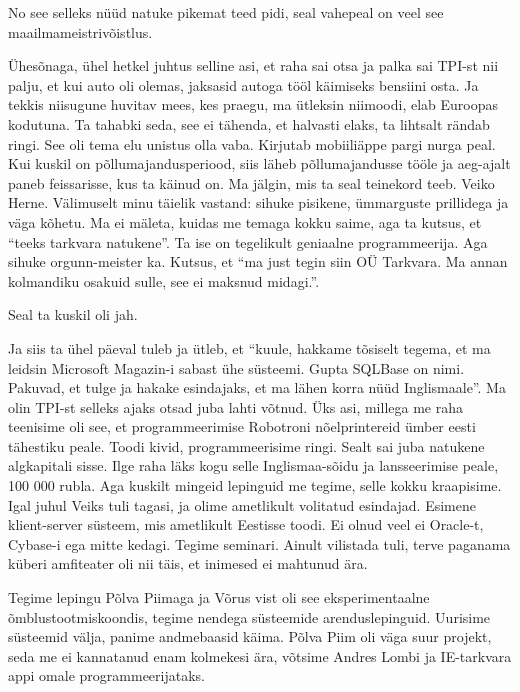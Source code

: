 
No see selleks nüüd natuke pikemat teed pidi, seal vahepeal on veel see maailmameistrivõistlus. 

Ühesõnaga, ühel hetkel juhtus selline asi, et raha sai otsa ja palka sai TPI-st nii palju, et kui auto oli olemas, jaksasid autoga tööl käimiseks bensiini osta. Ja tekkis niisugune huvitav mees, kes praegu, ma ütleksin niimoodi, elab Euroopas kodutuna. Ta tahabki seda, see ei tähenda, et halvasti elaks, ta lihtsalt rändab ringi. See oli tema elu unistus olla vaba. Kirjutab mobiiliäppe pargi nurga peal. Kui kuskil on põllumajandusperiood, siis läheb põllumajandusse tööle ja aeg-ajalt paneb feissarisse, kus ta käinud on. Ma jälgin, mis ta seal teinekord teeb. Veiko Herne. Välimuselt minu täielik vastand: sihuke pisikene, ümmarguste prillidega ja väga kõhetu. Ma ei mäleta, kuidas me temaga kokku saime, aga ta kutsus, et \enquote{teeks tarkvara natukene}. Ta ise on tegelikult geniaalne programmeerija. Aga sihuke orgunn-meister ka. Kutsus, et \enquote{ma just tegin siin OÜ Tarkvara. Ma annan kolmandiku osakuid sulle, see ei maksnud midagi.}.


Seal ta kuskil oli jah.

Ja siis ta ühel päeval tuleb ja ütleb, et \enquote{kuule, hakkame tõsiselt tegema, et ma  leidsin Microsoft Magazin-i sabast ühe süsteemi. Gupta SQLBase on nimi. Pakuvad, et tulge ja hakake esindajaks, et ma lähen korra nüüd Inglismaale}. Ma olin TPI-st selleks ajaks  otsad juba lahti võtnud. Üks asi, millega me raha teenisime oli see, et programmeerimise Robotroni nõelprintereid ümber eesti tähestiku peale. Toodi kivid, programmeerisime ringi. Sealt sai juba natukene algkapitali sisse. Ilge raha läks kogu selle Inglismaa-sõidu ja lansseerimise peale, 100 000 rubla. Aga kuskilt mingeid lepinguid me tegime, selle kokku kraapisime. Igal juhul Veiks tuli tagasi, ja olime ametlikult volitatud esindajad. Esimene klient-server süsteem, mis  ametlikult Eestisse toodi. Ei olnud veel ei Oracle-t, Cybase-i ega mitte kedagi. Tegime seminari. Ainult vilistada tuli, terve paganama küberi amfiteater oli nii täis, et inimesed ei mahtunud ära. 

Tegime lepingu Põlva Piimaga ja Võrus vist oli see eksperimentaalne õmblustootmiskoondis, tegime nendega süsteemide arenduslepinguid. Uurisime süsteemid välja, panime andmebaasid käima.  Põlva Piim oli väga suur projekt, seda me ei kannatanud enam kolmekesi ära, võtsime Andres Lombi ja IE-tarkvara appi omale programmeerijataks. 

